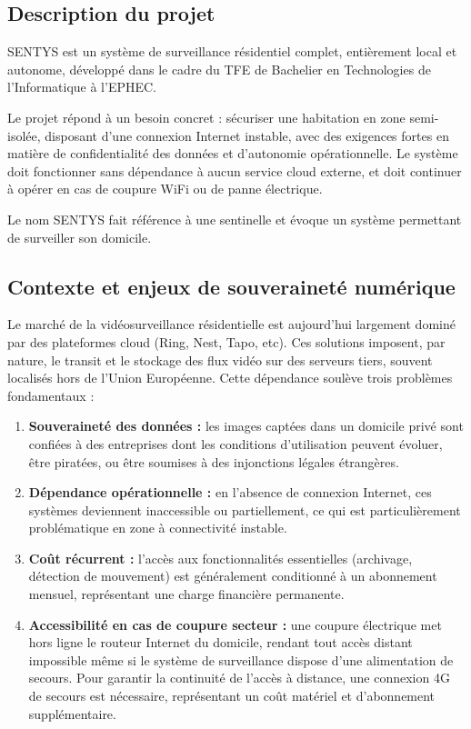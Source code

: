\documentclass[12pt,a4paper]{article}
\begin{document}
\subsection{Description du projet}

SENTYS est un système de surveillance résidentiel complet, entièrement local et autonome, développé dans le cadre du TFE de Bachelier en Technologies de l'Informatique à l'EPHEC.

Le projet répond à un besoin concret : sécuriser une habitation en zone semi-isolée, disposant d'une connexion Internet instable, avec des exigences fortes en matière de confidentialité des données et d'autonomie opérationnelle. Le système doit fonctionner sans dépendance à aucun service cloud externe, et doit continuer à opérer en cas de coupure WiFi ou de panne électrique.

Le nom SENTYS fait référence à une sentinelle et évoque un système permettant de surveiller son domicile.

\subsection{Contexte et enjeux de souveraineté numérique}

Le marché de la vidéosurveillance résidentielle est aujourd'hui largement dominé par des plateformes cloud (Ring, Nest, Tapo, etc). Ces solutions imposent, par nature, le transit et le stockage des flux vidéo sur des serveurs tiers, souvent localisés hors de l'Union Européenne. Cette dépendance soulève trois problèmes fondamentaux :

\begin{enumerate}
    \item \textbf{Souveraineté des données :} les images captées dans un domicile privé sont confiées à des entreprises dont les conditions d'utilisation peuvent évoluer, être piratées, ou être soumises à des injonctions légales étrangères.
    \item \textbf{Dépendance opérationnelle :} en l'absence de connexion Internet, ces systèmes deviennent inaccessible ou partiellement, ce qui est particulièrement problématique en zone à connectivité instable.
    \item \textbf{Coût récurrent :} l'accès aux fonctionnalités essentielles (archivage, détection de mouvement) est généralement conditionné à un abonnement mensuel, représentant une charge financière permanente.
    \item \textbf{Accessibilité en cas de coupure secteur :} une coupure électrique met hors ligne le routeur Internet du domicile, rendant tout accès distant impossible même si le système de surveillance dispose d'une alimentation de secours. Pour garantir la continuité de l'accès à distance, une connexion 4G de secours est nécessaire, représentant un coût matériel et d'abonnement supplémentaire.
\end{enumerate}
\end{document}
